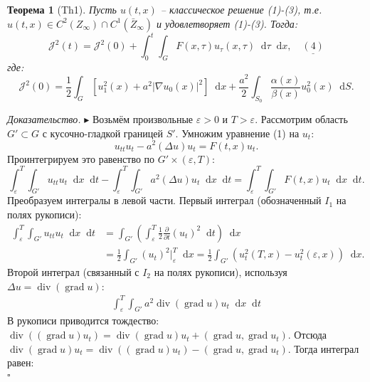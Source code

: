 \documentclass[12pt, a4paper]{article}
\newcommand{\dd}{\mathop{}\!\mathrm{d}} %
\newcommand{\grad}{\operatorname{grad}}
\newcommand{\dive}{\operatorname{div}}
\newtheorem{theorem}{Теорема}[section] %
\newenvironment{proof}[1][\proofname]{\par\noindent\textit{#1.}\quad}{\hfill$\square$}
\renewcommand{\proofname}{Доказательство}
\begin{document}
\begin{theorem}[Th1]
\label{thm:energy_conservation}
Пусть $u(t,x)$ -- классическое решение (1)-(3), т.е. $u(t,x) \in C^2(Z_\infty) \cap C^1(\bar{Z}_\infty)$ и удовлетворяет (1)-(3). Тогда:
\begin{equation} \label{eq:4}
\mathcal{J}^2(t) = \mathcal{J}^2(0) + \int_0^t \int_G F(x,\tau) u_\tau(x,\tau) \dd\tau \dd x, \quad \underline{(4)}
\end{equation}
где:
\begin{equation*}
\mathcal{J}^2(0) = \frac{1}{2} \int_G [u_1^2(x) + a^2 |\nabla u_0(x)|^2] \dd x + \frac{a^2}{2} \int_{S_0} \frac{\alpha(x)}{\beta(x)} u_0^2(x) \dd S.
\end{equation*}
\end{theorem}

\begin{proof}
$\blacktriangleright$ Возьмём произвольные $\varepsilon > 0$ и $T>\varepsilon$. Рассмотрим область $G' \subset G$ с кусочно-гладкой границей $S'$.
Умножим уравнение (1) на $u_t$:
\begin{equation*}
u_{tt} u_t - a^2 (\Delta u) u_t = F(t,x) u_t.
\end{equation*}
Проинтегрируем это равенство по $G' \times (\varepsilon, T)$:
\begin{equation*}
\int_\varepsilon^T \int_{G'} u_{tt} u_t \dd x \dd t - \int_\varepsilon^T \int_{G'} a^2 (\Delta u) u_t \dd x \dd t = \int_\varepsilon^T \int_{G'} F(t,x) u_t \dd x \dd t.
\end{equation*}
Преобразуем интегралы в левой части.
Первый интеграл (обозначенный $I_1$ на полях рукописи):
\begin{align*}
\int_\varepsilon^T \int_{G'} u_{tt} u_t \dd x \dd t &= \int_{G'} \left( \int_\varepsilon^T \frac{1}{2} \frac{\partial}{\partial t}(u_t)^2 \dd t \right) \dd x \\
&= \frac{1}{2} \int_{G'} (u_t)^2 \Big|_\varepsilon^T \dd x = \frac{1}{2} \int_{G'} (u_t^2(T,x) - u_t^2(\varepsilon,x)) \dd x.
\end{align*}
Второй интеграл (связанный с $I_2$ на полях рукописи), используя $\Delta u = \dive(\grad u)$:
\begin{align*}
\int_\varepsilon^T \int_{G'} a^2 \dive(\grad u) u_t \dd x \dd t
\end{align*}
В рукописи приводится тождество: $\dive( (\grad u) u_t) = \dive(\grad u) u_t + (\grad u, \grad u_t)$.
Отсюда $\dive(\grad u) u_t = \dive( (\grad u) u_t) - (\grad u, \grad u_t)$.
Тогда интеграл равен:
\begin{align*}

\end{align*}
\end{proof}
\end{document}
